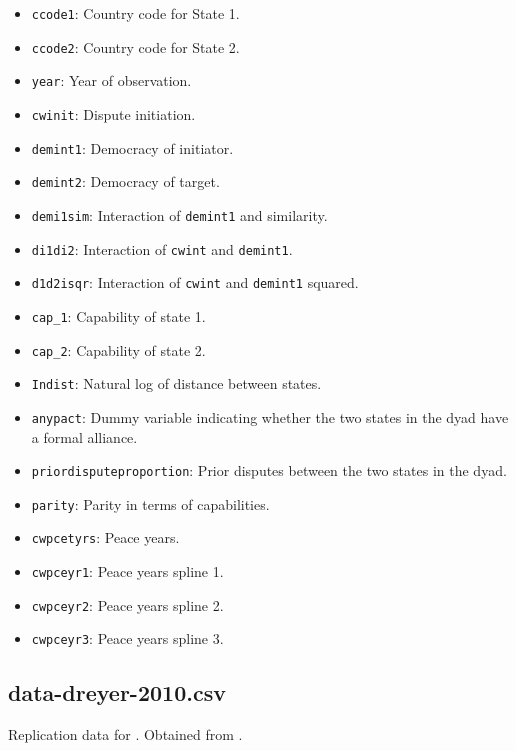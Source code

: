 \documentclass[12pt]{article}
\begin{document}
\begin{itemize}
  \item \texttt{ccode1}: Country code for State 1.
  \item \texttt{ccode2}: Country code for State 2.
  \item \texttt{year}: Year of observation.
  \item \texttt{cwinit}: Dispute initiation.
  \item \texttt{demint1}: Democracy of initiator.
  \item \texttt{demint2}: Democracy of target.
  \item \texttt{demi1sim}: Interaction of \texttt{demint1} and similarity.
  \item \texttt{di1di2}: Interaction of \texttt{cwint} and \texttt{demint1}.
  \item \texttt{d1d2isqr}: Interaction of \texttt{cwint} and \texttt{demint1} squared.
  \item \texttt{cap\_1}: Capability of state 1.
  \item \texttt{cap\_2}: Capability of state 2.
  \item \texttt{Indist}: Natural log of distance between states.
  \item \texttt{anypact}: Dummy variable indicating whether the two states in the dyad have a formal alliance.
  \item \texttt{priordisputeproportion}: Prior disputes between the two states in the dyad.
  \item \texttt{parity}: Parity in terms of capabilities.
  \item \texttt{cwpcetyrs}: Peace years.
  \item \texttt{cwpceyr1}: Peace years spline 1.
  \item \texttt{cwpceyr2}: Peace years spline 2.
  \item \texttt{cwpceyr3}: Peace years spline 3.
\end{itemize}

\subsection{data-dreyer-2010.csv}

Replication data for \citet{Dreyer:2010cu}.
Obtained from \citet{dreyer2010data}.
\end{document}
